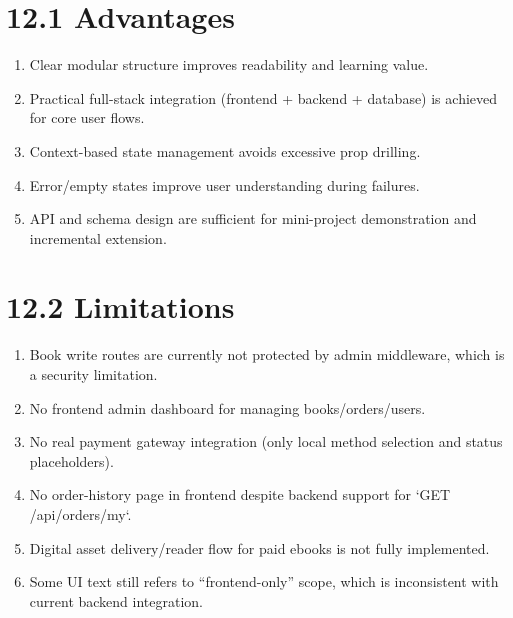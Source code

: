 \documentclass[12pt,a4paper]{report}
\begin{document}
\section*{12.1 Advantages}
\begin{enumerate}[label=\arabic*.]
    \item Clear modular structure improves readability and learning value.
    \item Practical full-stack integration (frontend + backend + database) is achieved for core user flows.
    \item Context-based state management avoids excessive prop drilling.
    \item Error/empty states improve user understanding during failures.
    \item API and schema design are sufficient for mini-project demonstration and incremental extension.
\end{enumerate}

\section*{12.2 Limitations}
\begin{enumerate}[label=\arabic*.]
    \item Book write routes are currently not protected by admin middleware, which is a security limitation.
    \item No frontend admin dashboard for managing books/orders/users.
    \item No real payment gateway integration (only local method selection and status placeholders).
    \item No order-history page in frontend despite backend support for `GET /api/orders/my`.
    \item Digital asset delivery/reader flow for paid ebooks is not fully implemented.
    \item Some UI text still refers to ``frontend-only'' scope, which is inconsistent with current backend integration.
\end{enumerate}
\end{document}
